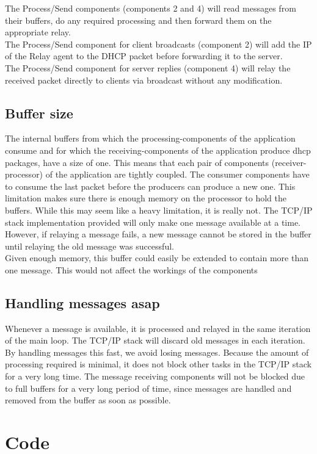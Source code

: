 \documentclass[11pt,a4paper]{scrartcl}
\begin{document}
The Process/Send components (components 2 and 4) will read messages from their buffers, do any required processing and then forward them on the appropriate relay.\\
The Process/Send component for client broadcasts (component 2) will add the IP of the Relay agent to the DHCP packet before forwarding it to the server.\\
The Process/Send component for server replies (component 4) will relay the received packet directly to clients via broadcast without any modification.

\subsection{Buffer size}
The internal buffers from which the processing-components of the application consume and for which the receiving-components of the application produce dhcp packages, have a size of one. This means that each pair of components (receiver-processor) of the application are tightly coupled. The consumer components have to consume the last packet before the producers can produce a new one. This limitation makes sure there is enough memory on the processor to hold the buffers. While this may seem like a heavy limitation, it is really not. The TCP/IP stack implementation provided will only make one message available at a time. However, if relaying a message fails, a new message cannot be stored in the buffer until relaying the old message was successful.\\
Given enough memory, this buffer could easily be extended to contain more than one message. This would not affect the workings of the components 

\subsection{Handling messages asap}
Whenever a message is available, it is processed and relayed in the same iteration of the main loop. The TCP/IP stack will discard old messages in each iteration. By handling messages this fast, we avoid losing messages. Because the amount of processing required is minimal, it does not block other tasks in the TCP/IP stack for a very long time. The message receiving components will not be blocked due to full buffers for a very long period of time, since messages are handled and removed from the buffer as soon as possible.

\newpage

\appendix
\section{Code}
\end{document}
